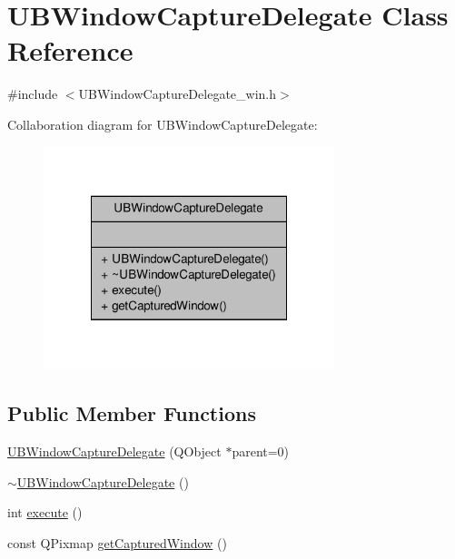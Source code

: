 \hypertarget{class_u_b_window_capture_delegate}{\section{U\-B\-Window\-Capture\-Delegate Class Reference}
\label{dc/d2b/class_u_b_window_capture_delegate}
}


{\ttfamily \#include $<$U\-B\-Window\-Capture\-Delegate\-\_\-win.\-h$>$}



Collaboration diagram for U\-B\-Window\-Capture\-Delegate\-:
\nopagebreak
\begin{figure}[H]
\begin{center}
\leavevmode
\includegraphics[width=240pt]{d6/de0/class_u_b_window_capture_delegate__coll__graph}
\end{center}
\end{figure}
\subsection*{Public Member Functions}
\begin{DoxyCompactItemize}
\item 
\hyperlink{class_u_b_window_capture_delegate_a2fdd05a7ac35fdc97b0976d760bcdad9}{U\-B\-Window\-Capture\-Delegate} (Q\-Object $\ast$parent=0)
\item 
\hyperlink{class_u_b_window_capture_delegate_aa59df8947f4d96c30660c5c14df4c61f}{$\sim$\-U\-B\-Window\-Capture\-Delegate} ()
\item 
int \hyperlink{class_u_b_window_capture_delegate_a1344c7c1a7a30b52c689f489d2d13317}{execute} ()
\item 
const Q\-Pixmap \hyperlink{class_u_b_window_capture_delegate_a2777e6726b1b363ac5c82fa4ce8b3858}{get\-Captured\-Window} ()
\end{DoxyCompactItemize}


